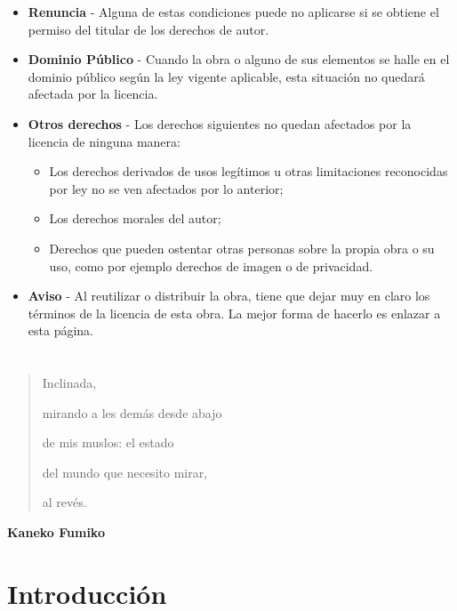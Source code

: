 \documentclass[
]{book}
\begin{document}
\begin{itemize}
\item
  \textbf{Renuncia} - Alguna de estas condiciones puede no aplicarse si se obtiene
  el permiso del titular de los derechos de autor.
\item
  \textbf{Dominio Público} - Cuando la obra o alguno de sus elementos se halle en
  el dominio público según la ley vigente aplicable, esta situación no quedará
  afectada por la licencia.
\item
  \textbf{Otros derechos} - Los derechos siguientes no quedan afectados por
  la licencia de ninguna manera:

  \begin{itemize}
  \item
    Los derechos derivados de usos legítimos u otras limitaciones
    reconocidas por ley no se ven afectados por lo anterior;
  \item
    Los derechos morales del autor;
  \item
    Derechos que pueden ostentar otras personas sobre la propia obra o
    su uso, como por ejemplo derechos de imagen o de privacidad.
  \end{itemize}
\item
  \textbf{Aviso} - Al reutilizar o distribuir la obra, tiene que dejar muy en claro
  los términos de la licencia de esta obra. La mejor forma de hacerlo es
  enlazar a esta página.
\end{itemize}

\hypertarget{section-1}{%
\chapter*{}\label{section-1}}

\begin{quote}
Inclinada,

mirando a les demás desde abajo

de mis muslos: el estado

del mundo que necesito mirar,

al revés.
\end{quote}

\textbf{Kaneko Fumiko}

\hypertarget{introducciuxf3n}{%
\chapter*{Introducción}\label{introducciuxf3n}}
\end{document}

